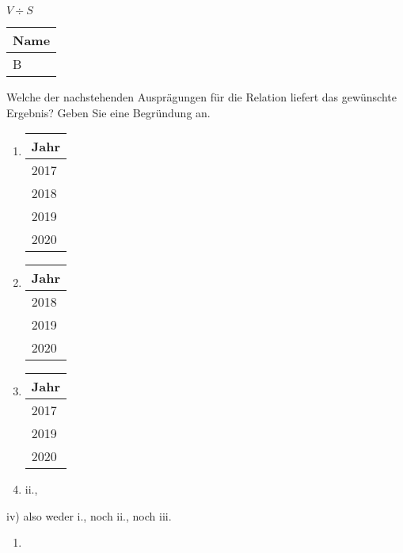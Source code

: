 \documentclass{bschlangaul-aufgabe}
\begin{document}
\begin{enumerate}
\begin{enumerate}
$V \div S$

\begin{center}

\begin{tabular}{|l|}
\hline
Name \\\hline\hline
B \\\hline
\end{tabular}
\end{center}

Welche der nachstehenden Ausprägungen für die Relation liefert das
gewünschte Ergebnis? Geben Sie eine Begründung an.

\begin{enumerate}
\item

\begin{tabular}{|l|}
\hline
Jahr\\\hline\hline
2017\\\hline
2018\\\hline
2019\\\hline
2020\\\hline
\end{tabular}

\item

\begin{tabular}{|l|}
\hline
Jahr\\\hline\hline
2018\\\hline
2019\\\hline
2020\\\hline
\end{tabular}

\item

\begin{tabular}{|l|}
\hline
Jahr\\\hline\hline
2017\\\hline
2019\\\hline
2020\\\hline
\end{tabular}

\item ii.,

\end{enumerate}

%

\begin{bAntwort}
iv) also weder i., noch ii., noch iii.

\begin{enumerate}
\item


\end{enumerate}
\end{bAntwort}
\end{enumerate}
\end{enumerate}
\end{document}
